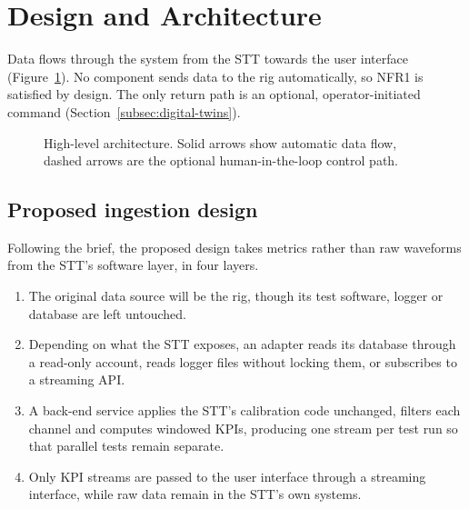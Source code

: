 \section{Design and Architecture}
\label{sec:design}

Data flows through the system from the STT towards the user interface (Figure~\ref{fig:architecture}).
No component sends data to the rig automatically, so NFR1 is satisfied by design.
The only return path is an optional, operator-initiated command (Section~\ref{subsec:digital-twins}).

\begin{figure}[!t]
    \centering
    \resizebox{\textwidth}{!}{}
    \caption{High-level architecture. Solid arrows show automatic data flow, dashed arrows are the optional human-in-the-loop control path.}
    \label{fig:architecture}
\end{figure}

\subsection{Proposed ingestion design}\label{subsec:ingestion-design}
Following the brief, the proposed design takes metrics rather than raw waveforms from the STT's software layer, in four layers.
\begin{enumerate}
    \item The original data source will be the rig, though its test software, logger or database are left untouched.
    \item Depending on what the STT exposes, an adapter reads its database through a read-only account, reads logger files without locking them, or subscribes to a streaming API\@.
    \item A back-end service applies the STT's calibration code unchanged, filters each channel and computes windowed KPIs, producing one stream per test run so that parallel tests remain separate.
    \item Only KPI streams are passed to the user interface through a streaming interface, while raw data remain in the STT's own systems.
\end{enumerate}

